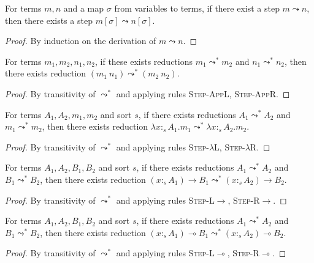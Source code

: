 \documentclass[sigplan,screen,review,anonymous]{acmart}
\newcommand{\rname}[1]{\textsc{\footnotesize #1}}
\newcommand{\stype}[1]{:_#1}
\newcommand{\step}{\leadsto}
\newcommand{\red}{\leadsto^*}
\begin{document}
\begin{lemma}\label{stepsubst}
  For terms $m, n$ and a map $\sigma$ from variables to terms, if there exist a step $m \step n$, then there exists a step $m[\sigma] \step n[\sigma]$.
\end{lemma}
\begin{proof}
  By induction on the derivation of $m \step n$.
\end{proof}

\begin{lemma}\label{redapp}
  For terms $m_1, m_2, n_1, n_2$, if these exists reductions $m_1 \red m_2$ and $n_1 \red n_2$, then there exists reduction $(m_1\ n_1) \red (m_2\ n_2)$.
\end{lemma}
\begin{proof}
  By transitivity of $\red$ and applying rules \rname{Step-AppL}, \rname{Step-AppR}.
\end{proof}

\begin{lemma}\label{redlam}
  For terms $A_1, A_2, m_1, m_2$ and sort $s$, if there exists reductions $A_1 \red A_2$ and $m_1 \red m_2$, then there exists reduction $\lambda x \stype{s}A_1.m_1 \red \lambda x \stype{s}A_2.m_2$.
\end{lemma}
\begin{proof}
  By transitivity of $\red$ and applying rules \rname{Step-$\lambda$L}, \rname{Step-$\lambda$R}.
\end{proof}

\begin{lemma}\label{redarrow}
  For terms $A_1, A_2, B_1, B_2$ and sort $s$, if there exists reductions $A_1 \red A_2$ and $B_1 \red B_2$, then there exists reduction $(x \stype{s}A_1) \rightarrow B_1 \red (x \stype{s} A_2) \rightarrow B_2$.
\end{lemma}
\begin{proof}
  By transitivity of $\red$ and applying rules \rname{Step-L$\rightarrow$}, \rname{Step-R$\rightarrow$}.
\end{proof}

\begin{lemma}\label{redlolli}
  For terms $A_1, A_2, B_1, B_2$ and sort $s$, if there exists reductions $A_1 \red A_2$ and $B_1 \red B_2$, then there exists reduction $(x \stype{s}A_1) \multimap B_1 \red (x \stype{s} A_2) \multimap B_2$.
\end{lemma}
\begin{proof}
  By transitivity of $\red$ and applying rules \rname{Step-L$\multimap$}, \rname{Step-R$\multimap$}.
\end{proof}
\end{document}
